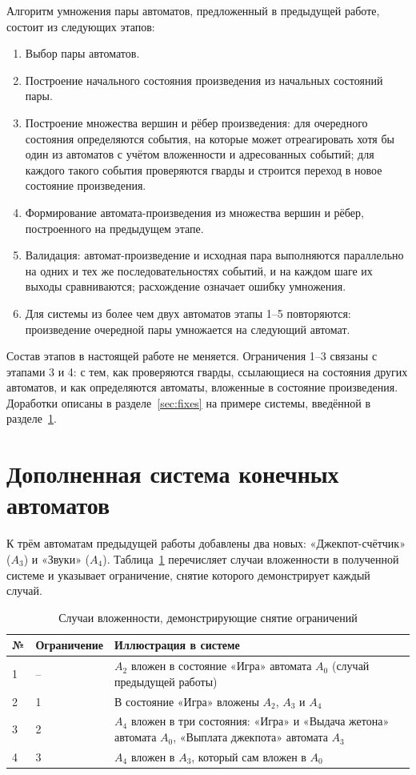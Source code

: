 \documentclass[12pt]{article}
\begin{document}
Алгоритм умножения пары автоматов, предложенный в предыдущей работе,
состоит из следующих этапов:

\begin{enumerate}
  \item Выбор пары автоматов.
  \item Построение начального состояния произведения из начальных
        состояний пары.
  \item Построение множества вершин и рёбер произведения: для очередного
        состояния определяются события, на которые может отреагировать хотя
        бы один из автоматов с учётом вложенности и адресованных событий;
        для каждого такого события проверяются гварды и строится переход в
        новое состояние произведения.
  \item Формирование автомата-произведения из множества вершин и рёбер,
        построенного на предыдущем этапе.
  \item Валидация: автомат-произведение и исходная пара выполняются
        параллельно на одних и тех же последовательностях событий, и на
        каждом шаге их выходы сравниваются; расхождение означает ошибку
        умножения.
  \item Для системы из более чем двух автоматов этапы 1--5 повторяются:
        произведение очередной пары умножается на следующий автомат.
\end{enumerate}

Состав этапов в настоящей работе не меняется. Ограничения 1--3 связаны с
этапами 3 и 4: с тем, как проверяются гварды, ссылающиеся на состояния
других автоматов, и как определяются автоматы, вложенные в состояние
произведения. Доработки описаны в разделе~\ref{sec:fixes} на примере
системы, введённой в разделе~\ref{sec:system}.

\section{Дополненная система конечных автоматов}
\label{sec:system}

К трём автоматам предыдущей работы добавлены два новых: «Джекпот-счётчик»
($A_3$) и «Звуки» ($A_4$). Таблица~\ref{tab:cases} перечисляет случаи
вложенности в полученной системе и указывает ограничение, снятие которого
демонстрирует каждый случай.

\begin{table}[H]
\centering
\caption{Случаи вложенности, демонстрирующие снятие ограничений}
\label{tab:cases}
\begin{tabular}{@{}p{0.6cm}p{3.2cm}p{9.6cm}@{}}
\toprule
№ & Ограничение & Иллюстрация в системе \\
\midrule
1 & -- & $A_2$ вложен в состояние «Игра» автомата $A_0$ (случай предыдущей работы) \\
2 & 1 & В состояние «Игра» вложены $A_2$, $A_3$ и $A_4$ \\
3 & 2 & $A_4$ вложен в три состояния: «Игра» и «Выдача жетона» автомата $A_0$, «Выплата джекпота» автомата $A_3$ \\
4 & 3 & $A_4$ вложен в $A_3$, который сам вложен в $A_0$ \\
\bottomrule
\end{tabular}
\end{table}
\end{document}
